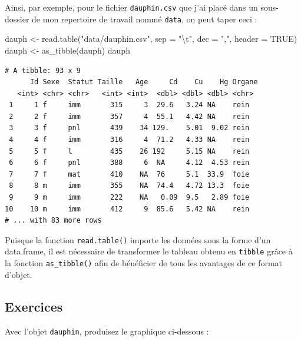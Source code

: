 \documentclass[
  letterpaper,
  DIV=11,
  numbers=noendperiod]{scrreprt}
\newenvironment{Shaded}{\begin{snugshade}}{\end{snugshade}}
\newcommand{\AttributeTok}[1]{\textcolor[rgb]{0.40,0.45,0.13}{#1}}
\newcommand{\ConstantTok}[1]{\textcolor[rgb]{0.56,0.35,0.01}{#1}}
\newcommand{\FunctionTok}[1]{\textcolor[rgb]{0.28,0.35,0.67}{#1}}
\newcommand{\NormalTok}[1]{\textcolor[rgb]{0.00,0.23,0.31}{#1}}
\newcommand{\OtherTok}[1]{\textcolor[rgb]{0.00,0.23,0.31}{#1}}
\newcommand{\SpecialCharTok}[1]{\textcolor[rgb]{0.37,0.37,0.37}{#1}}
\newcommand{\StringTok}[1]{\textcolor[rgb]{0.13,0.47,0.30}{#1}}
\begin{document}
Ainsi, par exemple, pour le fichier \texttt{dauphin.csv} que j'ai placé
dans un sous-dossier de mon repertoire de travail nommé \texttt{data},
on peut taper ceci :

\begin{Shaded}
\begin{Highlighting}[]
\NormalTok{dauph }\OtherTok{\textless{}{-}} \FunctionTok{read.table}\NormalTok{(}\StringTok{"data/dauphin.csv"}\NormalTok{,}
                    \AttributeTok{sep =} \StringTok{"}\SpecialCharTok{\textbackslash{}t}\StringTok{"}\NormalTok{,}
                    \AttributeTok{dec =} \StringTok{","}\NormalTok{,}
                    \AttributeTok{header =} \ConstantTok{TRUE}\NormalTok{)}
\NormalTok{dauph }\OtherTok{\textless{}{-}} \FunctionTok{as\_tibble}\NormalTok{(dauph)}
\NormalTok{dauph}
\end{Highlighting}
\end{Shaded}

\begin{verbatim}
# A tibble: 93 x 9
      Id Sexe  Statut Taille   Age     Cd    Cu    Hg Organe
   <int> <chr> <chr>   <int> <int>  <dbl> <dbl> <dbl> <chr> 
 1     1 f     imm       315     3  29.6   3.24 NA    rein  
 2     2 f     imm       357     4  55.1   4.42 NA    rein  
 3     3 f     pnl       439    34 129.    5.01  9.02 rein  
 4     4 f     imm       316     4  71.2   4.33 NA    rein  
 5     5 f     l         435    26 192     5.15 NA    rein  
 6     6 f     pnl       388     6  NA     4.12  4.53 rein  
 7     7 f     mat       410    NA  76     5.1  33.9  foie  
 8     8 m     imm       355    NA  74.4   4.72 13.3  foie  
 9     9 m     imm       222    NA   0.09  9.5   2.89 foie  
10    10 m     imm       412     9  85.6   5.42 NA    rein  
# ... with 83 more rows
\end{verbatim}

Puisque la fonction \texttt{read.table()} importe les données sous la
forme d'un data.frame, il est nécessaire de transformer le tableau
obtenu en \texttt{tibble} grâce à la fonction \texttt{as\_tibble()} afin
de bénéficier de tous les avantages de ce format d'objet.

\hypertarget{Exo-10}{%
\subsection{Exercices}\label{Exo-10}}

Avec l'objet \texttt{dauphin}, produisez le graphique ci-dessous :
\end{document}
